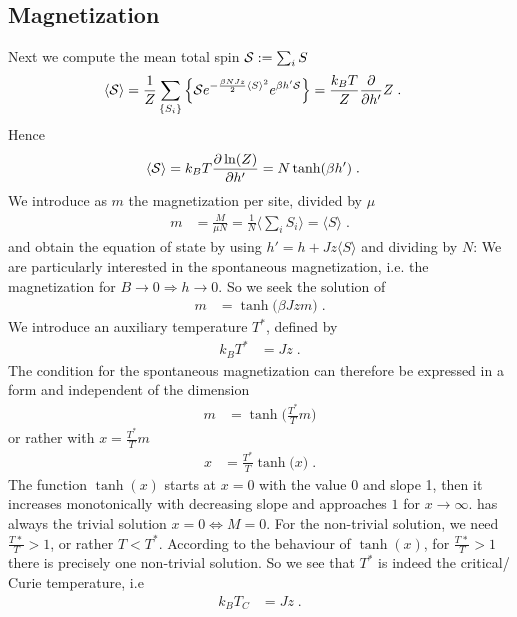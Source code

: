 \subsection{Magnetization}
Next we compute the mean total spin ${\cal S}:=\sum_{i}S$
%
\begin{align*}
\left\langle\cal S\right\rangle
&=\frac{1}{Z}\sum_{\{S_{i}\}} 
\left\{ 
{\cal S} e^{-\frac{\beta N J z}{2}\langle S \rangle^{2}} e^{\beta h' {\cal S}}
\right\}
= \frac{k_{B}T}{Z} \frac{\partial }{\partial h'} Z\;.
\end{align*}
%
Hence
%
\begin{align}\label{eq:}
\left\langle\cal S\right\rangle &=k_{B}T\frac{\partial \ln(Z)}{\partial h'}
= N \tanh(\beta h')\;.
\end{align}
We introduce as $m$ the magnetization per site, divided by $\mu$
%
\begin{align}
m &= \frac{M}{\mu N} = \frac{1}{N}\langle\sum_{i}S_{i}  \rangle = \langle S \rangle\;.
\end{align}
%
%
and obtain the equation of state by using $h' = h + J z \langle S \rangle $ and dividing by $N$:
We are particularly interested in the spontaneous magnetization, i.e. the magnetization for
$B\to 0 \Rightarrow h\to 0$. So we seek the solution of
%
\begin{align}\label{eq:magnetization:mfa}
m &= \tanh\big( \beta J z m\big)\;.
\end{align}
%
We introduce an auxiliary  temperature $T^{*}$, defined by
%
\begin{align}\label{eq:}
k_{B}T^{*} &= J z\;.
\end{align}
%
The condition for the spontaneous magnetization can therefore be expressed in a form and independent of the dimension
%
\begin{align}\label{eq:ising:mfa:mag}
m &=\tanh\big( \frac{T^{*}}{T} m \big)
\end{align}
%
or rather with $x = \frac{T^{*}}{T}m$
\begin{align}\label{eq:magnetization:mf}
x &= \frac{T^{*}}{T} \tanh\big( x \big)\;.
\end{align}
The function $\tanh(x)$ starts at $x=0$ with the value $0$ and slope 1, then it increases monotonically with  decreasing slope and approaches $1$ for $x\to \infty$.  
 has always the trivial solution $x=0 \Leftrightarrow  M=0$. For the non-trivial solution,
we need $\frac{T^{}*}{T}>1$, or rather $T<T^{*}$. According to the behaviour of $\tanh(x)$, for $\frac{T^{}*}{T}> 1$ there is precisely one non-trivial solution.
So we see that $T^{*}$ is indeed the critical/ Curie temperature, i.e
%
\begin{align}\label{eq:}
k_{B} T_{C}&=J z\;.
\end{align}
%

